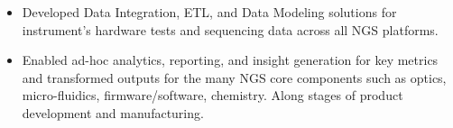 \documentclass[10pt,a4paper]{altacv}
\begin{document}
\begin{itemize}
    \item   \small{Developed Data Integration, ETL, and Data Modeling solutions for instrument's hardware tests and sequencing data across all NGS platforms.}
    \item   \small{Enabled ad-hoc analytics, reporting, and insight generation for key metrics and transformed outputs for the many NGS core components such as optics, micro-fluidics, firmware/software, chemistry. Along stages of product development and manufacturing.}
\end{itemize}

\medskip






\end{document}
